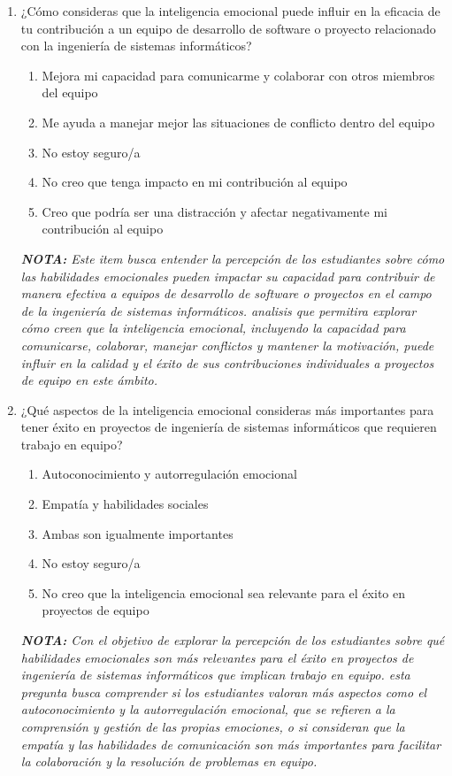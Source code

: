 \documentclass[journal]{IEEEtran}
\begin{document}
\begin{enumerate}
	\item ¿Cómo consideras que la inteligencia emocional puede influir en la eficacia de tu contribución a un equipo de desarrollo de software o proyecto relacionado con la ingeniería de sistemas informáticos?
	\begin{enumerate}
		\item Mejora mi capacidad para comunicarme y colaborar con otros miembros del equipo
		\item Me ayuda a manejar mejor las situaciones de conflicto dentro del equipo
		\item No estoy seguro/a
		\item No creo que tenga impacto en mi contribución al equipo
		\item Creo que podría ser una distracción y afectar negativamente mi contribución al equipo
	\end{enumerate}
	\textit{\textbf{NOTA:} Este item busca entender la percepción de los estudiantes sobre cómo las habilidades emocionales pueden impactar su capacidad para contribuir de manera efectiva a equipos de desarrollo de software o proyectos en el campo de la ingeniería de sistemas informáticos. analisis que permitira explorar cómo creen que la inteligencia emocional, incluyendo la capacidad para comunicarse, colaborar, manejar conflictos y mantener la motivación, puede influir en la calidad y el éxito de sus contribuciones individuales a proyectos de equipo en este ámbito.}
	\item ¿Qué aspectos de la inteligencia emocional consideras más importantes para tener éxito en proyectos de ingeniería de sistemas informáticos que requieren trabajo en equipo?
	\begin{enumerate}
		\item Autoconocimiento y autorregulación emocional
		\item Empatía y habilidades sociales
		\item Ambas son igualmente importantes
		\item No estoy seguro/a
		\item No creo que la inteligencia emocional sea relevante para el éxito en proyectos de equipo
	\end{enumerate}
	\textit{\textbf{NOTA:} Con el objetivo de explorar la percepción de los estudiantes sobre qué habilidades emocionales son más relevantes para el éxito en proyectos de ingeniería de sistemas informáticos que implican trabajo en equipo. esta pregunta busca comprender si los estudiantes valoran más aspectos como el autoconocimiento y la autorregulación emocional, que se refieren a la comprensión y gestión de las propias emociones, o si consideran que la empatía y las habilidades de comunicación son más importantes para facilitar la colaboración y la resolución de problemas en equipo.}

\end{enumerate}
\end{document}
